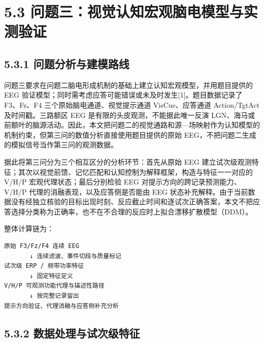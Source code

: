 \documentclass[
]{article}
\author{}
\date{}
\begin{document}
\hypertarget{ux95eeux9898ux4e09ux89c6ux89c9ux8ba4ux77e5ux5b8fux89c2ux8111ux7535ux6a21ux578bux4e0eux5b9eux6d4bux9a8cux8bc1}{%
\section{5.3
问题三：视觉认知宏观脑电模型与实测验证}\label{ux95eeux9898ux4e09ux89c6ux89c9ux8ba4ux77e5ux5b8fux89c2ux8111ux7535ux6a21ux578bux4e0eux5b9eux6d4bux9a8cux8bc1}}

\hypertarget{ux95eeux9898ux5206ux6790ux4e0eux5efaux6a21ux8defux7ebf}{%
\subsection{5.3.1
问题分析与建模路线}\label{ux95eeux9898ux5206ux6790ux4e0eux5efaux6a21ux8defux7ebf}}

问题三要求在问题二脑电形成机制的基础上建立认知宏观模型，并用题目提供的
EEG 验证模型；同时需考虑应答可能错误或未及时发生{[}1{]}。题目数据记录了
F3、Fz、F4 三个原始脑电通道、视觉提示通道 VisCue、应答通道 Action/TgtAct
及时间戳。三路额区 EEG 是有限的头皮观测，不能据此唯一反演
LGN、海马或前额叶的脑源活动。因此，本文把问题二的视觉通路和源---场映射作为认知模型的机制约束，但第三问的数值分析直接使用题目提供的原始
EEG，不把问题二生成的模拟信号当作第三问的观测数据。

据此将第三问分为三个相互区分的分析环节：首先从原始 EEG
建立试次级观测特征；其次以视觉前馈、记忆匹配和认知控制为解释框架，构造与特征一一对应的
V/H/P 宏观代理状态；最后分别检验 EEG 对提示方向的跨记录预测能力、V/H/P
代理的消融表现，以及应答侧是否能由 EEG
状态补充解释。由于当前数据没有经独立核验的目标出现时刻、反应截止时间和逐试次正确答案，本文不把应答选择分类称为正确率，也不在不合理的反应时上拟合漂移扩散模型（DDM）。

整体计算链为：

\begin{verbatim}
原始 F3/Fz/F4 连续 EEG
       ↓ 连续滤波、事件切段与质量标记
试次级 ERP / 频带功率特征
       ↓ 固定特征定义
V/H/P 可观测功能代理与描述性路径
       ↓ 按完整记录留出
提示方向验证、代理消融与应答侧补充分析
\end{verbatim}

\hypertarget{ux6570ux636eux5904ux7406ux4e0eux8bd5ux6b21ux7ea7ux7279ux5f81}{%
\subsection{5.3.2
数据处理与试次级特征}\label{ux6570ux636eux5904ux7406ux4e0eux8bd5ux6b21ux7ea7ux7279ux5f81}}
\end{document}
